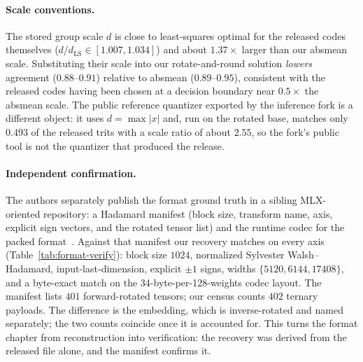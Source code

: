 \paragraph{Scale conventions.}
The stored group scale $d$ is close to least-squares optimal for the released
codes themselves ($d/d_{\mathrm{LS}} \in [1.007, 1.034]$) and about
$1.37\times$ larger than our absmean scale. Substituting their scale into our
rotate-and-round solution \emph{lowers} agreement ($0.88$--$0.91$) relative to
absmean ($0.89$--$0.95$), consistent with the released codes having been chosen
at a decision boundary near $0.5\times$ the absmean scale. The public reference
quantizer exported by the inference fork is a different object: it uses
$d=\max|x|$ and, run on the rotated base, matches only $0.493$ of the released
trits with a scale ratio of about $2.55$, so the fork's public tool is not the
quantizer that produced the release.

\paragraph{Independent confirmation.}
The authors separately publish the format ground truth in a sibling
MLX-oriented repository: a Hadamard manifest (block size, transform name, axis,
explicit sign vectors, and the rotated tensor list) and the runtime codec for
the packed format~\citep{prismbonsai2mlx}. Against that manifest our recovery
matches on every axis (Table~\ref{tab:format-verify}): block size $1024$,
normalized Sylvester Walsh--Hadamard, input-last-dimension, explicit
$\pm 1$ signs, widths $\{5120, 6144, 17408\}$, and a byte-exact match on the
34-byte-per-128-weights codec layout. The manifest lists $401$ forward-rotated
tensors; our census counts $402$ ternary payloads. The difference is the
embedding, which is inverse-rotated and named separately; the two counts
coincide once it is accounted for. This turns the format chapter from
reconstruction into verification: the recovery was derived from the released
file alone, and the manifest confirms it.

